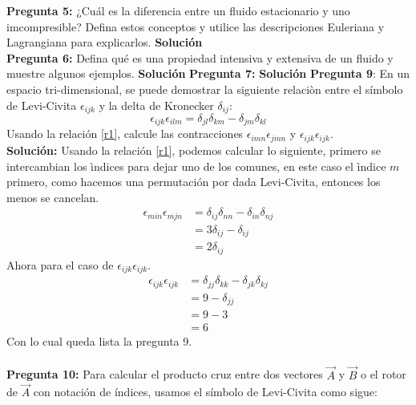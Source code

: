 \documentclass[11pt,letterpaper]{article}
\begin{document}
\textbf{Pregunta 5:} ¿Cuál es la diferencia entre un fluido estacionario y uno imcompresible? Defina estos
conceptos y utilice las descripciones Euleriana y Lagrangiana para explicarlos.
\textbf{Solución}
\\
\textbf{Pregunta 6:} Defina qué es una propiedad intensiva y extensiva de un fluido y muestre algunos
ejemplos.
\textbf{Solución} 
\textbf{Pregunta 7:} 
\textbf{Solución} 
\textbf{Pregunta 9}: En un espacio tri-dimensional, se puede demostrar la siguiente relaciòn entre el símbolo de Levi-Civita $\epsilon_{ijk}$ y la delta de Kronecker $\delta_{ij}$:
\begin{equation} \label{r1}
    \epsilon_{ijk}\epsilon_{ilm} = \delta_{jl}\delta_{km}-\delta_{jm} \delta_{kl}
\end{equation}
 Usando la relación \eqref{r1}, calcule las contracciones $\epsilon_{imn}\epsilon_{jmn}$ y $\epsilon_{ijk}\epsilon_{ijk}$. \\
\textbf{Solución:} Usando la relación \eqref{r1}, podemos calcular lo siguiente, primero se intercambian los ìndices para dejar uno de los comunes, en este caso el ìndice $m$ primero, como hacemos una permutación por dada Levi-Civita, entonces los menos se cancelan.
\begin{align*}
    \epsilon_{min}\epsilon_{mjn} & = \delta_{ij}\delta_{nn}-\delta_{in}\delta_{nj} \\
    & = 3 \delta_{ij} - \delta_{ij} \\
    & = 2 \delta_{ij}
\end{align*}
Ahora para el caso de $\epsilon_{ijk}\epsilon_{ijk}$.
\begin{align*}
    \epsilon_{ijk}\epsilon_{ijk} &  = \delta_{jj}\delta_{kk}-\delta_{jk}\delta_{kj} \\
    & = 9 - \delta_{jj} \\
    & = 9 - 3 \\
    & = 6
\end{align*}
Con lo cual queda lista la pregunta 9. \\
\\
\textbf{Pregunta 10:} Para calcular el producto cruz entre dos vectores $\vec{A}$ y $\vec{B}$ o el rotor de $\vec{A}$ con notación de índices, usamos el símbolo de Levi-Civita como sigue: 
\end{document}
